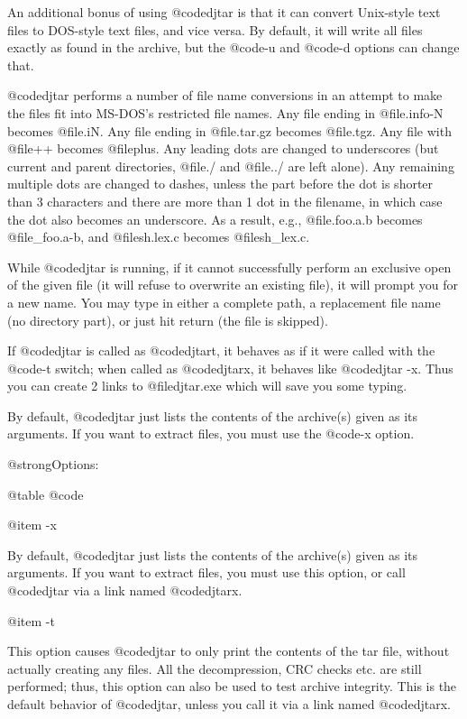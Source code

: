 An additional bonus of using @code{djtar} is that it can convert
Unix-style text files to DOS-style text files, and vice versa.  By
default, it will write all files exactly as found in the archive, but the
@code{-u} and @code{-d} options can change that.

@code{djtar} performs a number of file name conversions in an attempt
to make the files fit into MS-DOS's restricted file names.  Any file
ending in @file{.info-N} becomes @file{.iN}.  Any file ending in
@file{.tar.gz} becomes @file{.tgz}.  Any file with @file{++} becomes
@file{plus}.  Any leading dots are changed to underscores (but current
and parent directories, @file{./} and @file{../} are left alone).  Any
remaining multiple dots are changed to dashes, unless the part before the
dot is shorter than 3 characters and there are more than 1 dot in the
filename, in which case the dot also becomes an underscore.  As a result,
e.g., @file{.foo.a.b} becomes @file{_foo.a-b}, and @file{sh.lex.c} becomes
@file{sh_lex.c}.

While @code{djtar} is running, if it cannot successfully perform an
exclusive open of the given file (it will refuse to overwrite an
existing file), it will prompt you for a new name.  You may type in
either a complete path, a replacement file name (no directory part), or
just hit return (the file is skipped).

If @code{djtar} is called as @code{djtart}, it behaves as if it were
called with the @code{-t} switch; when called as @code{djtarx}, it
behaves like @code{djtar -x}.  Thus you can create 2 links to
@file{djtar.exe} which will save you some typing.

By default, @code{djtar} just lists the contents of the archive(s)
given as its arguments.  If you want to extract files, you must use
the @code{-x} option.

@strong{Options:}

@table @code

@item -x

By default, @code{djtar} just lists the contents of the archive(s)
given as its arguments.  If you want to extract files, you must use
this option, or call @code{djtar} via a link named @code{djtarx}.

@item -t

This option causes @code{djtar} to only print the contents of the tar
file, without actually creating any files.  All the decompression, CRC
checks etc. are still performed; thus, this option can also be used to
test archive integrity.  This is the default behavior of
@code{djtar}, unless you call it via a link named @code{djtarx}.

